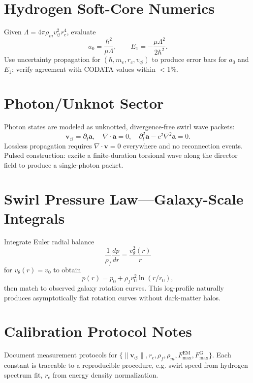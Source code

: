 \documentclass[reprint,aps,onecolumn,nofootinbib]{revtex4-2}
\begin{document}
    \section{Hydrogen Soft-Core Numerics}
    \label{canon58:appD}
    Given $\Lambda = 4\pi \rho_{\!m} v_{\!\boldsymbol{\circlearrowleft}}^{2} r_c^{4}$,
    evaluate
    \[
        a_0 = \frac{\hbar^{2}}{\mu \Lambda}, \qquad
        E_1 = - \frac{\mu \Lambda^{2}}{2\hbar^{2}}.
    \]
    Use uncertainty propagation for $(\hbar, m_e, r_c, v_{\!\boldsymbol{\circlearrowleft}})$ to
    produce error bars for $a_0$ and $E_1$; verify agreement with CODATA values
    within $<1\%$.

    \section{Photon/Unknot Sector}
    \label{canon58:appE}
    Photon states are modeled as unknotted, divergence-free swirl wave packets:
    \[
        \mathbf{v}_{\!\boldsymbol{\circlearrowleft}} = \partial_t \mathbf{a}, \quad
        \nabla \cdot \mathbf{a} = 0, \quad
        \partial_t^{2}\mathbf{a} - c^{2}\nabla^{2}\mathbf{a} = 0.
    \]
    Lossless propagation requires $\nabla\cdot\mathbf{v}=0$ everywhere and
    no reconnection events. Pulsed construction: excite a finite-duration
    torsional wave along the director field to produce a single-photon packet.

    \section{Swirl Pressure Law—Galaxy-Scale Integrals}
    \label{canon58:appF}
    Integrate Euler radial balance
    \[
        \frac{1}{\rho_{\!f}}\frac{dp}{dr} = \frac{v_{\theta}^{2}(r)}{r}
    \]
    for $v_\theta(r)=v_0$ to obtain
    \[
        p(r) = p_0 + \rho_{\!f} v_0^{2} \ln(r/r_0),
    \]
    then match to observed galaxy rotation curves. This log-profile naturally
    produces asymptotically flat rotation curves without dark-matter halos.

    \section{Calibration Protocol Notes}
    \label{canon58:appG}
    Document measurement protocols for
    $\{\lVert \mathbf{v}_{\!\boldsymbol{\circlearrowleft}}\rVert, r_c, \rho_{\!f}, \rho_{\!m},
    F_{\max}^{\mathrm{EM}}, F_{\max}^{\mathrm{G}}\}$.
    Each constant is traceable to a reproducible procedure, e.g.
    swirl speed from hydrogen spectrum fit, $r_c$ from energy density normalization.
\end{document}
